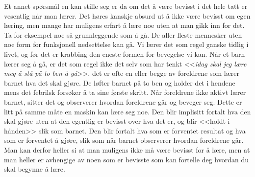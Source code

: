 Et annet spørsmål en kan stille seg er da om det å være bevisst i det hele tatt er vesentlig når man lærer. 
Det høres kanskje absurd ut å ikke være bevisst om egen læring, men mange har muligens erfart å lære noe uten at man gikk inn for det. 
Ta for eksempel noe så grunnleggende som å gå.
De aller fleste mennesker uten noe form for funksjonell nedsettelse kan gå. 
Vi lærer det som regel ganske tidlig i livet, og før det er krabbing den eneste formen for bevegelse vi kan. 
Når et barn lærer seg å gå, er det som regel ikke det selv som har tenkt <<\textit{idag skal jeg lære meg å stå på to ben å gå}>>, det er ofte en eller begge av foreldrene som lærer barnet hva det skal gjøre. 
De løfter barnet på to ben og holder det i hendene mens det febrilsk forsøker å ta sine første skritt. 
Når foreldrene ikke aktivt lærer barnet, sitter det og observerer hvordan foreldrene går og beveger seg. 
Dette er litt på samme måte en maskin kan lære seg noe.
Den blir implisitt fortalt hva den skal gjøre uten at den egentlig er bevisst over hva det er, og blir <<holdt i hånden>> slik som barnet. 
Den blir fortalt hva som er forventet resultat og hva som er forventet å gjøre, slik som når barnet observerer hvordan foreldrene går. Man kan derfor heller si at man muligens ikke må være bevisst for å lære, men at man heller er avhengige av noen som er bevisste som kan fortelle deg hvordan du skal begynne å lære. 

